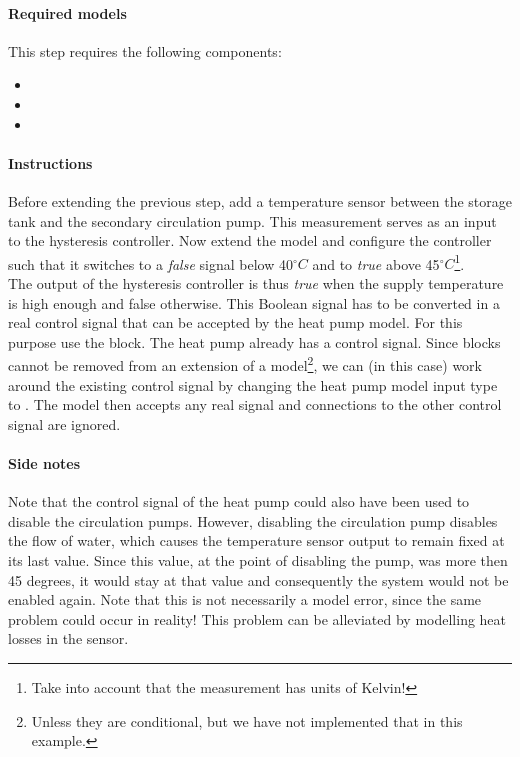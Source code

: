 \documentclass[10pt,a4paper]{article}
\begin{document}
\paragraph{Required models}
This step requires the following components:
\begin{itemize}
\item {}
\item {}
\item {}
\end{itemize}

\paragraph{Instructions}
Before extending the previous step, add a temperature sensor between the storage tank
and the secondary circulation pump.
This measurement serves as an input to the hysteresis controller.
Now extend the model and configure the controller such that it switches to a \textit{false} signal below
40$^{\circ}C$ and to \textit{true} above 45$^{\circ}C$\footnote{Take into account that the measurement has units of Kelvin!}.\\

The output of the hysteresis controller is thus \textit{true} when the supply temperature is 
high enough and false otherwise.
This Boolean signal has to be converted in a real control signal that can be
accepted by the heat pump model.
For this purpose use the  block.
The heat pump already has a control signal. 
Since blocks cannot be removed from an extension of a model\footnote{Unless 
they are conditional, but we have not implemented that in this example.},
we can (in this case) work around the existing control signal
by changing the heat pump model input type to .
The model then accepts any real signal and connections to the other control 
signal are ignored. 


\paragraph{Side notes}
Note that the control signal of the heat pump could also have been used to disable
the circulation pumps.
However, disabling the circulation pump disables the flow of water,
which causes the temperature sensor output to remain fixed at
its last value.
Since this value, at the point of disabling the pump, was more then 45 degrees,
it would stay at that value and consequently the system would not be enabled again.
Note that this is not necessarily a model error, since the same problem could
occur in reality! This problem can be alleviated by modelling
heat losses in the sensor.\\
\end{document}

